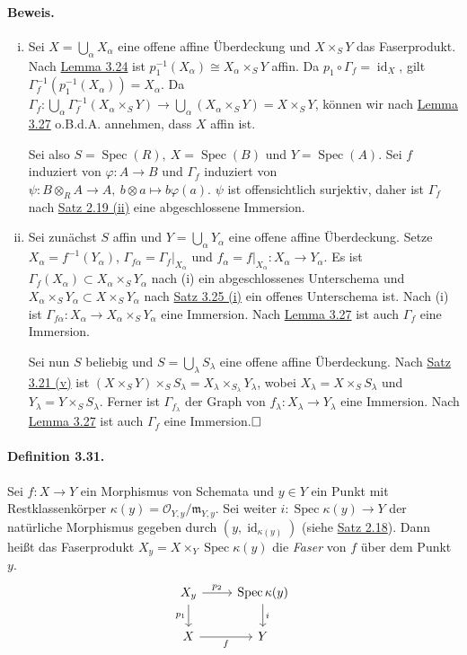\documentclass[11pt,b5paper,openany]{memoir}
\def \qed {$\hfill\square$}
\begin{document}
\paragraph{Beweis.} \begin{enumerate}[(i)]
\item Sei $X=\bigcup_\alpha X_\alpha$ eine offene affine Überdeckung und $X\times_SY$ das Faserprodukt. Nach \hyperref[3.24]{Lemma 3.24} ist $p_1^{-1}(X_\alpha)\cong X_\alpha\times_SY$ affin. Da $p_1\circ\Gamma_f=\operatorname{id}_X$, gilt $\Gamma_f^{-1}(p_1^{-1}(X_\alpha))=X_\alpha$. Da $\Gamma_f: \bigcup_\alpha\Gamma_f^{-1}(X_\alpha\times_SY) \to \bigcup_\alpha(X_\alpha\times_SY)=X\times_SY$, können wir nach \hyperref[3.27]{Lemma 3.27} o.B.d.A. annehmen, dass $X$ affin ist.

Sei also $S=\operatorname{Spec}(R),\ X=\operatorname{Spec}(B)$ und $Y=\operatorname{Spec}(A)$. Sei $f$ induziert von $\varphi:A\to B$ und $\Gamma_f$ induziert von $\psi:B\otimes_RA\to A,\ b\otimes a\mapsto b\varphi(a)$. $\psi$ ist offensichtlich surjektiv, daher ist $\Gamma_f$ nach \hyperref[2.19]{Satz 2.19 (ii)} eine abgeschlossene Immersion.
\item Sei zunächst $S$ affin und $Y=\bigcup_\alpha Y_\alpha$ eine offene affine Überdeckung. Setze $X_\alpha=f^{-1}(Y_\alpha)$, $\Gamma_{f\alpha}=\Gamma_f|_{X_\alpha}$ und $f_\alpha=f|_{X_\alpha}:X_\alpha\to Y_\alpha$. Es ist $\Gamma_f(X_\alpha)\subset X_\alpha\times_SY_\alpha$ nach (i) ein abgeschlossenes Unterschema und $X_\alpha\times_SY_\alpha\subset X\times_SY_\alpha$ nach \hyperref[3.25]{Satz 3.25 (i)} ein offenes Unterschema ist. Nach (i) ist $\Gamma_{f\alpha}:X_\alpha\to X_\alpha\times_SY_\alpha$ eine Immersion. Nach \hyperref[3.27]{Lemma 3.27} ist auch $\Gamma_f$ eine Immersion.

Sei nun $S$ beliebig und $S=\bigcup_\lambda S_\lambda$ eine offene affine Überdeckung. Nach \hyperref[3.21]{Satz 3.21 (v)} ist $(X\times_SY)\times_SS_\lambda=X_\lambda\times_{S_\lambda}Y_\lambda$, wobei $X_\lambda=X\times_SS_\lambda$ und $Y_\lambda=Y\times_SS_\lambda$. Ferner ist $\Gamma_{f_\lambda}$ der Graph von $f_\lambda:X_\lambda\to Y_\lambda$ eine Immersion. Nach \hyperref[3.27]{Lemma 3.27} ist auch $\Gamma_f$ eine Immersion.\qed
\end{enumerate}

\paragraph{Definition 3.31.}\label{3.31} Sei $f:X\to Y$ ein Morphismus von Schemata und $y\in Y$ ein Punkt mit Restklassenkörper $\kappa(y)=\mathcal{O}_{Y,y}/\mathfrak{m}_{Y,y}$. Sei weiter $i:\operatorname{Spec}\kappa(y)\to Y$ der natürliche Morphismus gegeben durch $(y,\operatorname{id}_{\kappa(y)})$ (siehe \hyperref[2.18]{Satz 2.18}). Dann heißt das Faserprodukt $X_y=X\times_Y\operatorname{Spec}\kappa(y)$ die \textit{Faser} von $f$ über dem Punkt $y$.
\[\begin{tikzcd}
X_y\ar[r, "p_2"]\ar[d, "p_1"'] & \operatorname{Spec}\kappa(y)\ar[d, "i"]\\
X\ar[r, "f"'] & Y
\end{tikzcd}\]
\end{document}
